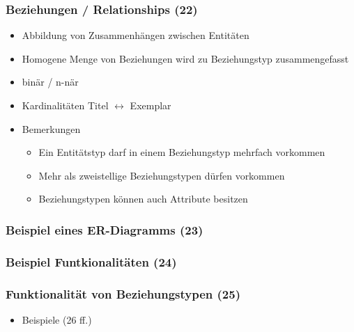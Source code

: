 \subsubsection{Beziehungen / Relationships (22)}
	\begin{itemize}
		\item Abbildung von Zusammenhängen zwischen Entitäten
		\item Homogene Menge von Beziehungen wird zu Beziehungstyp zusammengefasst
		\item binär / n-när
		\item Kardinalitäten Titel \(\leftrightarrow\) Exemplar
		\item Bemerkungen
		\begin{itemize}
		\item Ein Entitätstyp darf in einem Beziehungstyp mehrfach vorkommen
		\item Mehr als zweistellige Beziehungstypen dürfen vorkommen
		\item Beziehungstypen können auch Attribute besitzen
		\end{itemize}
	\end{itemize}
\subsubsection{Beispiel eines ER-Diagramms (23)}
\subsubsection{Beispiel Funtkionalitäten (24)}
\subsubsection{Funktionalität von Beziehungstypen (25)}
	\begin{itemize}
		\item Beispiele (26 ff.)
	\end{itemize}
